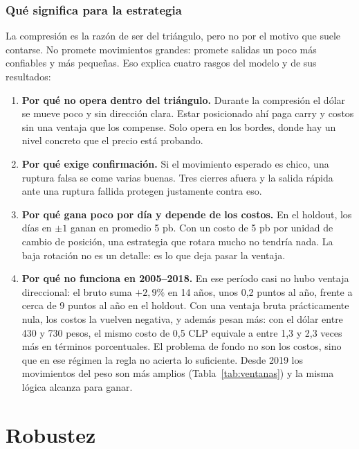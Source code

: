 \documentclass[10pt,a4paper]{article}
\begin{document}
\subsubsection{Qué significa para la estrategia}

La compresión es la razón de ser del triángulo, pero no por el motivo que suele
contarse. No promete movimientos grandes: promete salidas un poco más confiables y más
pequeñas. Eso explica cuatro rasgos del modelo y de sus resultados:
\begin{enumerate}
  \item \textbf{Por qué no opera dentro del triángulo.} Durante la compresión el dólar
        se mueve poco y sin dirección clara. Estar posicionado ahí paga carry y costos
        sin una ventaja que los compense. Solo opera en los bordes, donde hay un nivel
        concreto que el precio está probando.
  \item \textbf{Por qué exige confirmación.} Si el movimiento esperado es chico, una
        ruptura falsa se come varias buenas. Tres cierres afuera y la salida rápida ante
        una ruptura fallida protegen justamente contra eso.
  \item \textbf{Por qué gana poco por día y depende de los costos.} En el holdout, los
        días en $\pm1$ ganan en promedio 5 pb. Con un costo de 5 pb por unidad de cambio
        de posición, una estrategia que rotara mucho no tendría nada. La baja rotación no
        es un detalle: es lo que deja pasar la ventaja.
  \item \textbf{Por qué no funciona en 2005--2018.} En ese período casi no hubo ventaja
        direccional: el bruto suma $+2{,}9\%$ en 14 años, unos 0,2 puntos al año, frente
        a cerca de 9 puntos al año en el holdout. Con una ventaja bruta prácticamente
        nula, los costos la vuelven negativa, y además pesan más: con el dólar entre 430
        y 730 pesos, el mismo costo de 0,5 CLP equivale a entre 1,3 y 2,3 veces más en
        términos porcentuales. El problema de fondo no son los costos, sino que en ese
        régimen la regla no acierta lo suficiente. Desde 2019 los movimientos del peso
        son más amplios (Tabla~\ref{tab:ventanas}) y la misma lógica alcanza para ganar.
\end{enumerate}

\section{Robustez}\label{sec:robustez}
\end{document}
